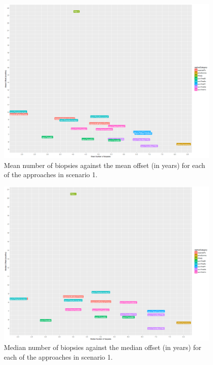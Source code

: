 \begin{figure}[H]
\centering
\captionsetup{justification=centering}
\includegraphics[width=\textwidth]{sim_study_res_sc_10_sh_7pt5/mean_offsetvsnb.png}
\caption{\label{fig : sc_10_sh_7pt5_mean_offsetvsnb} Mean number of biopsies against the mean offset (in years) for each of the approaches in scenario 1.}
\end{figure}

\begin{figure}[H]
\centering
\captionsetup{justification=centering}
\includegraphics[width=\textwidth]{sim_study_res_sc_10_sh_7pt5/median_offsetvsnb.png}
\caption{\label{fig : sc_10_sh_7pt5_median_offsetvsnb}Median number of biopsies against the median offset (in years) for each of the approaches in scenario 1.}
\end{figure}

